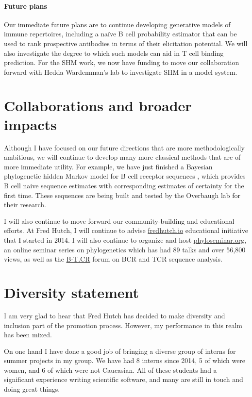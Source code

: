\documentclass[nobib]{tufte-handout}
\begin{document}
\paragraph{Future plans}
Our immediate future plans are to continue developing generative models of immune repertoires, including a na\"ive B cell probability estimator that can be used to rank prospective antibodies in terms of their elicitation potential.
We will also investigate the degree to which such models can aid in T cell binding prediction.
For the SHM work, we now have funding to move our collaboration forward with Hedda Wardemman's lab to investigate SHM in a model system.

\section{Collaborations and broader impacts}

Although I have focused on our future directions that are more methodologically ambitious, we will continue to develop many more classical methods that are of more immediate utility.
For example, we have just finished a Bayesian phylogenetic hidden Markov model for B cell receptor sequences \cite{Dhar2019-qg}, which provides B cell naive sequence estimates with corresponding estimates of certainty for the first time.
These sequences are being built and tested by the Overbaugh lab for their research.

I will also continue to move forward our community-building and educational efforts.
At Fred Hutch, I will continue to advise \href{http://fredhutch.io/}{fredhutch.io} educational initiative that I started in 2014.
I will also continue to organize and host \href{http://phyloseminar.org/}{phyloseminar.org}, an online seminar series on phylogenetics which has had 89 talks and over 56,800 views, as well as the \href{http://b-t.cr/}{B-T.CR} forum on BCR and TCR sequence analysis.


\section{Diversity statement}

I am very glad to hear that Fred Hutch has decided to make diversity and inclusion part of the promotion process.
However, my performance in this realm has been mixed.

On one hand I have done a good job of bringing a diverse group of interns for summer projects in my group.
We have had 8 interns since 2014, 5 of which were women, and 6 of which were not Caucasian.
All of these students had a significant experience writing scientific software, and many are still in touch and doing great things.
\end{document}
